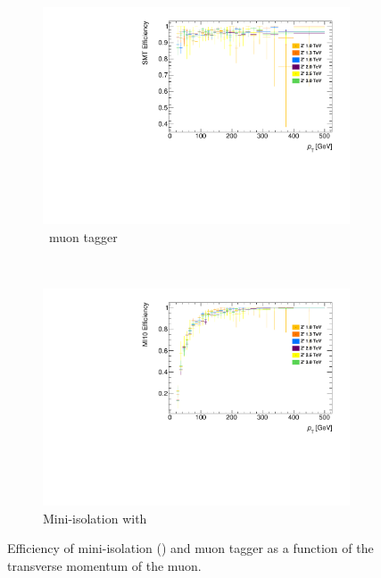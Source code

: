 \begin{figure}[t]
\begin{subfigure}{0.49\linewidth}\tabularnewline
  \centering
  \includegraphics[width=\textwidth]{PartBoosted/Plots/he_staco_smt_pt.pdf}
  \caption{\xsm\ muon tagger} \label{fig:BoostedSMTeffVsPt}
\end{subfigure}
~
\begin{subfigure}{0.49\linewidth}
  \centering
  \includegraphics[width=\textwidth]{PartBoosted/Plots/he_muid_mi10_pt.pdf}
  \caption{Mini-isolation with } \label{fig:BoostedMIeffVsPt}
\end{subfigure}

\caption{Efficiency of mini-isolation () and \xsm muon tagger as a function of the transverse momentum of the muon.} \label{fig:BoostedEfficiencyVsPt}
\end{figure}

